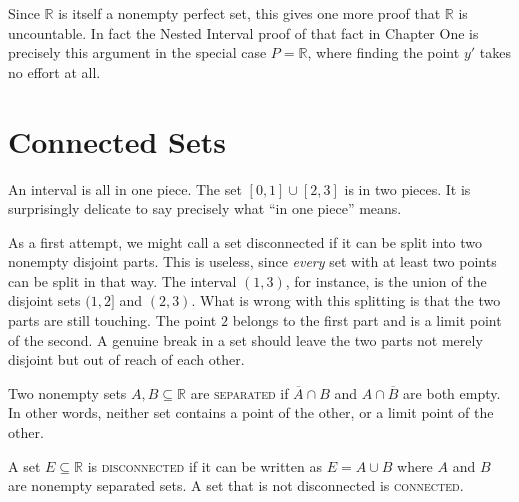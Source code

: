 \begin{marginfigure}
\centering
{}
\caption{One step of the construction.  The new interval is centered on a point $y'$ of $P$ and is short enough to avoid $x_n$.}
\end{marginfigure}

Since $\mathbb{R}$ is itself a nonempty perfect set, this gives one more proof that $\mathbb{R}$ is uncountable.  In fact the Nested Interval proof of that fact in Chapter One is precisely this argument in the special case $P = \mathbb{R}$, where finding the point $y'$ takes no effort at all.

\section{Connected Sets}

An interval is all in one piece.  The set $[0,1] \cup [2,3]$ is in two pieces.  It is surprisingly delicate to say precisely what ``in one piece'' means.

As a first attempt, we might call a set disconnected if it can be split into two nonempty disjoint parts.  This is useless, since \emph{every} set with at least two points can be split in that way.  The interval $(1,3)$, for instance, is the union of the disjoint sets $(1,2]$ and $(2,3)$.  What is wrong with this splitting is that the two parts are still touching.  The point $2$ belongs to the first part and is a limit point of the second.  A genuine break in a set should leave the two parts not merely disjoint but out of reach of each other.

\begin{definition}
Two nonempty sets $A, B \subseteq \mathbb{R}$ are \textsc{separated} if $\overline{A} \cap B$ and $A \cap \overline{B}$ are both empty.  In other words, neither set contains a point of the other, or a limit point of the other.

A set $E \subseteq \mathbb{R}$ is \textsc{disconnected} if it can be written as $E = A \cup B$ where $A$ and $B$ are nonempty separated sets.  A set that is not disconnected is \textsc{connected}.
\end{definition}

